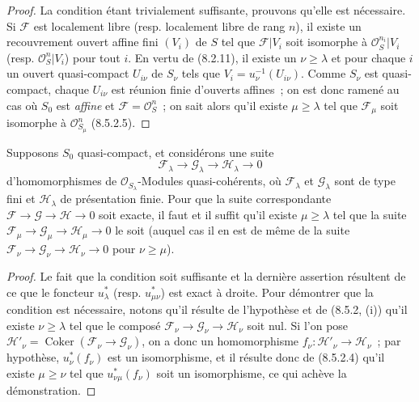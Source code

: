 \begin{proof}
La condition étant trivialement suffisante, prouvons qu'elle est nécessaire.
Si $\mathcal F$ est localement libre (resp. localement libre de rang $n$), il
existe un recouvrement ouvert affine fini $(V_i)$ de $S$ tel que
$\mathcal F|V_i$ soit isomorphe à $\mathcal O_S^{n_i}|V_i$ (resp.
$\mathcal O_S^n|V_i$) pour tout $i$. En vertu de (8.2.11), il existe un
$\nu\geq\lambda$ et pour chaque $i$ un ouvert quasi-compact $U_{i\nu}$ de
$S_\nu$ tels que $V_i=u_\nu^{-1}(U_{i\nu})$. Comme $S_\nu$ est quasi-compact,
chaque $U_{i\nu}$ est réunion finie d'ouverts affines~; on est donc ramené au
cas où $S_0$ est \emph{affine} et $\mathcal F=\mathcal O_S^n$~; on sait alors qu'il
existe $\mu\geq\lambda$ tel que $\mathcal F_\mu$ soit isomorphe à
$\mathcal O_{S_\mu}^n$ (8.5.2.5).
\end{proof}

\begin{proposition}[8.5.6]
\label{IV.8.5.6-fr}
Supposons $S_0$ quasi-compact, et considérons une suite
\[
  \mathcal F_\lambda\longrightarrow\mathcal G_\lambda
  \longrightarrow\mathcal H_\lambda\longrightarrow0
\]
d'homomorphismes de $\mathcal O_{S_\lambda}$-Modules quasi-cohérents, où
$\mathcal F_\lambda$ et $\mathcal G_\lambda$ sont de type fini et
$\mathcal H_\lambda$ de présentation finie. Pour que la suite correspondante
$\mathcal F\to\mathcal G\to\mathcal H\to0$ soit exacte, il faut et il suffit
qu'il existe $\mu\geq\lambda$ tel que la suite
$\mathcal F_\mu\to\mathcal G_\mu\to\mathcal H_\mu\to0$ le soit (auquel cas il
en est de même de la suite
$\mathcal F_\nu\to\mathcal G_\nu\to\mathcal H_\nu\to0$ pour
$\nu\geq\mu$).
\end{proposition}

\begin{proof}
Le fait que la condition soit suffisante et la dernière assertion résultent
de ce que le foncteur $u_\lambda^*$ (resp. $u_{\mu\nu}^*$) est exact à droite.
Pour démontrer que la condition est nécessaire, notons qu'il résulte de
l'hypothèse et de (8.5.2, (i)) qu'il existe $\nu\geq\lambda$ tel que le composé
$\mathcal F_\nu\to\mathcal G_\nu\to\mathcal H_\nu$ soit nul. Si l'on pose
$\mathcal H'_\nu=\operatorname{Coker}(\mathcal F_\nu\to\mathcal G_\nu)$, on a
donc un homomorphisme $f_\nu:\mathcal H'_\nu\to\mathcal H_\nu$~; par
hypothèse, $u_\nu^*(f_\nu)$ est un isomorphisme, et il résulte donc de
(8.5.2.4) qu'il existe $\mu\geq\nu$ tel que $u_{\nu\mu}^*(f_\nu)$ soit un
isomorphisme, ce qui achève la démonstration.
\end{proof}

